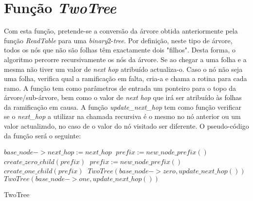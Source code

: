 \documentclass[twocolumn]{article}
\begin{document}
\section{Função \textit{TwoTree}}
Com esta função, pretende-se a conversão da árvore obtida anteriormente pela função \textit{ReadTable} para uma \textit{binary}2-\textit{tree}. Por definição, neste tipo de árvore, todos os nós que não são folhas têm exactamente dois "filhos". Desta forma, o algoritmo percorre recursivamente os nós da árvore. Se ao chegar a uma folha e a mesma não tiver um valor de \textit{next hop} atribuído actualiza-o. Caso o nó não seja uma folha, verifica qual a ramificação em falta, cria-a e chama a rotina para cada ramo. A função tem como parâmetros de entrada um ponteiro para o topo da árvore/sub-árvore, bem como o valor de \textit{next hop} que irá ser atribuído às folhas da ramificação em  causa. A função \textit{update\_next\_hop} tem como função verificar se o \textit{next\_hop} a utilizar na chamada recursiva é o mesmo no nó anterior ou um valor actualizado, no caso de o valor do nó visitado ser diferente.
O pseudo-código da função será o seguinte:
\begin{algorithmic}
 		\State $base\_node->next\_hop:=next\_hop\;$
 	\EndIf
 \Else
 		\State $prefix:=new\_node\_prefix()\;$
 		\State $create\_zero\_child(prefix)\;$
 	\Else
			\State $prefix:=new\_node\_prefix()\;$
			\State $create\_one\_child(prefix)\;$
		\EndIf
 	\EndIf
 	\State $TwoTree(base\_node->zero, update\_next\_hop())\;$
 	\State $TwoTree(base\_node->one, update\_next\_hop())\;$
 \EndIf
 
 \Return\;
 \caption{TwoTree}
\end{algorithmic}
\end{document}
